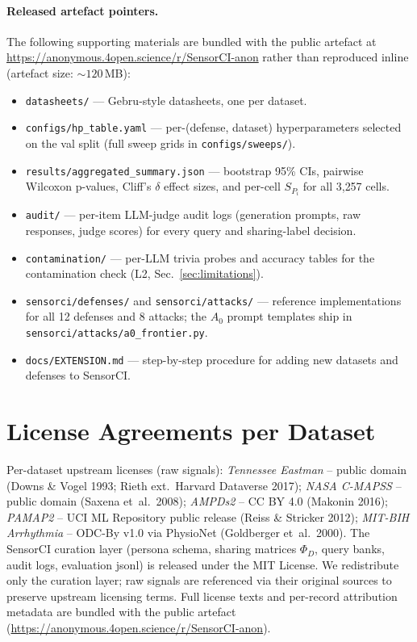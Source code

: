 \documentclass{article}
\theoremstyle{remark}
\begin{document}
\paragraph{Released artefact pointers.} The following supporting materials are bundled with the public artefact at \url{https://anonymous.4open.science/r/SensorCI-anon} rather than reproduced inline (artefact size: ${\sim}\!120$\,MB):
\begin{itemize}
\item \texttt{datasheets/} --- Gebru-style datasheets, one per dataset.
\item \texttt{configs/hp\_table.yaml} --- per-(defense, dataset) hyperparameters selected on the val split (full sweep grids in \texttt{configs/sweeps/}).
\item \texttt{results/aggregated\_summary.json} --- bootstrap 95\% CIs, pairwise Wilcoxon p-values, Cliff's $\delta$ effect sizes, and per-cell $S_{P_i}$ for all 3{,}257 cells.
\item \texttt{audit/} --- per-item LLM-judge audit logs (generation prompts, raw responses, judge scores) for every query and sharing-label decision.
\item \texttt{contamination/} --- per-LLM trivia probes and accuracy tables for the contamination check (L2, Sec.~\ref{sec:limitations}).
\item \texttt{sensorci/defenses/} and \texttt{sensorci/attacks/} --- reference implementations for all 12 defenses and 8 attacks; the $A_0$ prompt templates ship in \texttt{sensorci/attacks/a0\_frontier.py}.
\item \texttt{docs/EXTENSION.md} --- step-by-step procedure for adding new datasets and defenses to SensorCI.
\end{itemize}

\section{License Agreements per Dataset}
Per-dataset upstream licenses (raw signals): \emph{Tennessee Eastman} -- public domain (Downs \& Vogel 1993; Rieth ext.\ Harvard Dataverse 2017); \emph{NASA C-MAPSS} -- public domain (Saxena et~al.\ 2008); \emph{AMPDs2} -- CC BY 4.0 (Makonin 2016); \emph{PAMAP2} -- UCI ML Repository public release (Reiss \& Stricker 2012); \emph{MIT-BIH Arrhythmia} -- ODC-By v1.0 via PhysioNet (Goldberger et~al.\ 2000). The SensorCI curation layer (persona schema, sharing matrices $\Phi_D$, query banks, audit logs, evaluation jsonl) is released under the MIT License. We redistribute only the curation layer; raw signals are referenced via their original sources to preserve upstream licensing terms. Full license texts and per-record attribution metadata are bundled with the public artefact (\url{https://anonymous.4open.science/r/SensorCI-anon}).
\end{document}
